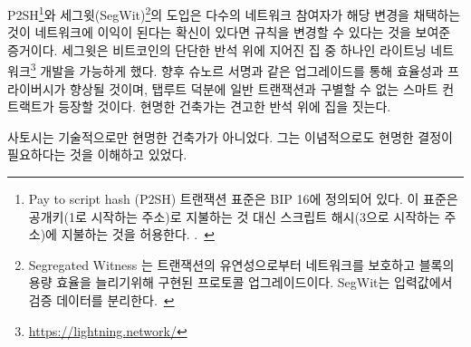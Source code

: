 \begin{comment}
	The introduction of pay to script hash\footnote{ Pay to script hash (P2SH)
		transactions were standardised in BIP 16. They allow transactions to be sent to
		a script hash (address starting with 3) instead of a public key hash (addresses
		starting with 1).~\cite{btcwiki:p2sh}} and segregated
	witness\footnote{Segregated Witness (abbreviated as SegWit) is an implemented
		protocol upgrade intended to provide protection from transaction malleability
		and increase block capacity. SegWit separates the \textit{witness} from the list
		of inputs.~\cite{btcwiki:segwit}} are proof that Bitcoin's rules can be changed
	if enough users are convinced that adopting said change is to the benefit of the
	network. The latter enabled the development of the lightning
	network\footnote{\url{https://lightning.network/}}, which is one of the houses
	being built on Bitcoin's solid foundation. Future upgrades like Schnorr
	signatures~\cite{bip:schnorr} will enhance efficiency and privacy, as well as
	scripts (read: smart contracts) which will be indistinguishable from regular
	transactions thanks to Taproot~\cite{taproot}. Wise builders do indeed build on
	solid foundations.
\end{comment}
P2SH\footnote{Pay to script hash (P2SH)
	트랜잭션 표준은 BIP 16에 정의되어 있다. 이 표준은 공개키(1로 시작하는 주소)로 지불하는 것 대신 스크립트 해시(3으로 시작하는 주소)에 지불하는 것을 허용한다.
	.~\cite{btcwiki:p2sh}}와
세그윗(SegWit)\footnote{Segregated Witness 는
	트랜잭션의 유연성으로부터 네트워크를 보호하고 블록의 용량 효율을 늘리기위해 구현된 프로토콜 업그레이드이다.
	SegWit는 입력값에서 검증 데이터를 분리한다.~\cite{btcwiki:segwit}}의 도입은
다수의 네트워크 참여자가 해당 변경을 채택하는 것이 네트워크에 이익이 된다는 확신이 있다면 규칙을 변경할 수 있다는 것을 보여준 증거이다.
세그윗은 비트코인의 단단한 반석 위에 지어진 집 중 하나인 라이트닝 네트워크\footnote{\url{https://lightning.network/}} 개발을 가능하게 했다.
향후 슈노르 서명\cite{bip:schnorr}과 같은 업그레이드를 통해 효율성과 프라이버시가 향상될 것이며, 탭루트 덕분에 일반 트랜잭션과 구별할 수 없는 스마트 컨트랙트가 등장할 것이다.
현명한 건축가는 견고한 반석 위에 집을 짓는다.
		
\begin{comment}
	Satoshi wasn't only a wise builder technologically. He also understood
	that it would be necessary to make wise decisions ideologically.
\end{comment}
사토시는 기술적으로만 현명한 건축가가 아니었다.
그는 이념적으로도 현명한 결정이 필요하다는 것을 이해하고 있었다.

